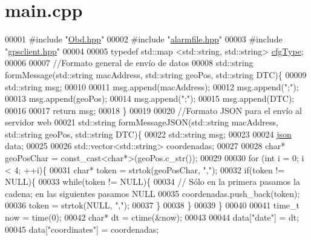 \hypertarget{main_8cpp_source}{}\section{main.\+cpp}
\label{main_8cpp_source}

\begin{DoxyCode}
00001 \textcolor{preprocessor}{#include "\hyperlink{Obd_8hpp}{Obd.hpp}"}
00002 \textcolor{preprocessor}{#include "\hyperlink{alarmfile_8hpp}{alarmfile.hpp}"}
00003 \textcolor{preprocessor}{#include "\hyperlink{gpsclient_8hpp}{gpsclient.hpp}"}
00004 
00005 \textcolor{keyword}{typedef}  std::map <std::string, std::string> \hyperlink{loadcfg_8hpp_a3bc0e674227412446fc364a733cebde6}{cfgType};
00006 
00007 \textcolor{comment}{//Formato general de envío de datos}
00008 std::string formMessage(std::string macAddress, std::string geoPos, std::string DTC)\{
00009     std::string msg;
00010 
00011     msg.append(macAddress);
00012     msg.append(\textcolor{stringliteral}{";"});
00013     msg.append(geoPos);
00014     msg.append(\textcolor{stringliteral}{";"});
00015     msg.append(DTC);
00016 
00017     \textcolor{keywordflow}{return} msg;
00018 \}
00019 
00020 \textcolor{comment}{//Formato JSON para el envío al servidor web}
00021 std::string formMessageJSON(std::string macAddress, std::string geoPos, std::string DTC)\{
00022     std::string msg;
00023 
00024     \hyperlink{Commands_8hpp_ab701e3ac61a85b337ec5c1abaad6742d}{json} data;
00025 
00026     std::vector<std::string> coordenadas;
00027     
00028     \textcolor{keywordtype}{char}* geoPosChar = \textcolor{keyword}{const\_cast<}\textcolor{keywordtype}{char}*\textcolor{keyword}{>}(geoPos.c\_str());
00029 
00030     \textcolor{keywordflow}{for} (\textcolor{keywordtype}{int} i = 0; i < 4; ++i)\{
00031             \textcolor{keywordtype}{char}* token = strtok(geoPosChar, \textcolor{stringliteral}{","});
00032             \textcolor{keywordflow}{if}(token != NULL)\{
00033                 \textcolor{keywordflow}{while}(token != NULL)\{
00034                 \textcolor{comment}{// Sólo en la primera pasamos la cadena; en las siguientes pasamos NULL}
00035                 coordenadas.push\_back(token);
00036                 token = strtok(NULL, \textcolor{stringliteral}{","});
00037                 \}
00038             \}
00039     \}
00040 
00041     time\_t now = time(0);
00042     \textcolor{keywordtype}{char}* dt = ctime(&now);
00043 
00044     data[\textcolor{stringliteral}{"date"}] = dt;
00045     data[\textcolor{stringliteral}{"coordinates"}] = coordenadas;

\end{DoxyCode}
